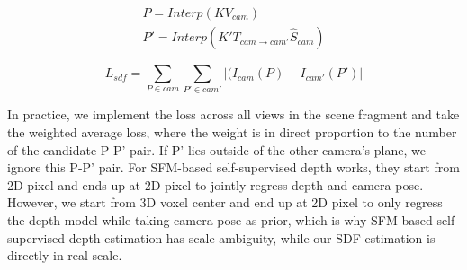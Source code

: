 \vspace{-5mm}
\begin{equation}
\begin{split}
    P = Interp(KV_{cam}) \\
    P' = Interp(K'T_{cam\xrightarrow{}cam'}\hat{S}_{cam})
\end{split}
\label{eq:point_proj}
\end{equation}
\vspace{-6mm}

\vspace{-4mm}
\begin{equation}
    L_{sdf} = \sum_{P \in cam}\sum_{P'\in cam'}{|(I_{cam}(P) - I_{cam'}(P')|}
\label{eq:pts_loss}
\end{equation}
\vspace{-4mm}

In practice, we implement the loss across all views in the scene fragment and take the weighted average loss, where the weight is in direct proportion to the number of the candidate P-P' pair. If P' lies outside of the other camera's plane, we ignore this P-P' pair. For SFM-based self-supervised depth works, they start from 2D pixel and ends up at 2D pixel to jointly regress depth and camera pose. However, we start from 3D voxel center and end up at 2D pixel to only regress the depth model while taking camera pose as prior, which is why SFM-based self-supervised depth estimation has scale ambiguity, while our SDF estimation is directly in real scale. 

